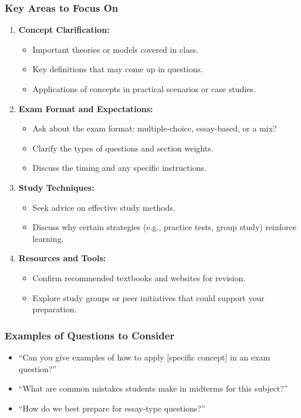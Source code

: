 \documentclass[aspectratio=169]{beamer}
\begin{document}
\begin{frame}[fragile]
    \frametitle{Key Areas to Focus On}
    \begin{enumerate}
        \item \textbf{Concept Clarification:}
            \begin{itemize}
                \item Important theories or models covered in class.
                \item Key definitions that may come up in questions.
                \item Applications of concepts in practical scenarios or case studies.
            \end{itemize}
        
        \item \textbf{Exam Format and Expectations:}
            \begin{itemize}
                \item Ask about the exam format: multiple-choice, essay-based, or a mix?
                \item Clarify the types of questions and section weights.
                \item Discuss the timing and any specific instructions.
            \end{itemize}
        
        \item \textbf{Study Techniques:}
            \begin{itemize}
                \item Seek advice on effective study methods.
                \item Discuss why certain strategies (e.g., practice tests, group study) reinforce learning.
            \end{itemize}
        
        \item \textbf{Resources and Tools:}
            \begin{itemize}
                \item Confirm recommended textbooks and websites for revision.
                \item Explore study groups or peer initiatives that could support your preparation.
            \end{itemize}
    \end{enumerate}
\end{frame}

\begin{frame}[fragile]
    \frametitle{Examples of Questions to Consider}
    \begin{itemize}
        \item “Can you give examples of how to apply [specific concept] in an exam question?”
        \item “What are common mistakes students make in midterms for this subject?”
        \item “How do we best prepare for essay-type questions?”
    \end{itemize}
\end{frame}
\end{document}
